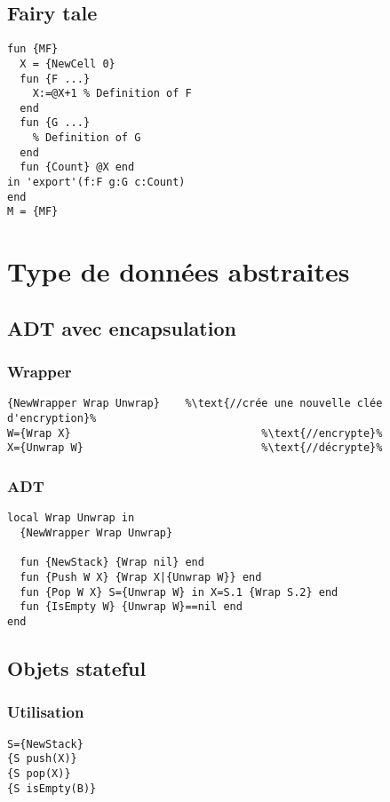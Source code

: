 \documentclass{report}
\begin{document}
\subsection{Fairy tale}
\begin{lstlisting}
fun {MF} 
  X = {NewCell 0}
  fun {F ...} 
    X:=@X+1 % Definition of F
  end 
  fun {G ...} 
    % Definition of G
  end 
  fun {Count} @X end
in 'export'(f:F g:G c:Count)
end
M = {MF}
\end{lstlisting}

\section{Type de données abstraites}
\subsection{ADT avec encapsulation}
\subsubsection*{Wrapper}
\begin{lstlisting}[escapechar=\%]
{NewWrapper Wrap Unwrap}	%\text{//crée une nouvelle clée d'encryption}%
W={Wrap X} 								%\text{//encrypte}%
X={Unwrap W} 							%\text{//décrypte}%
\end{lstlisting}
\subsubsection{ADT}
\begin{lstlisting}[escapechar=\%]
local Wrap Unwrap in
  {NewWrapper Wrap Unwrap}

  fun {NewStack} {Wrap nil} end 
  fun {Push W X} {Wrap X|{Unwrap W}} end 
  fun {Pop W X} S={Unwrap W} in X=S.1 {Wrap S.2} end
  fun {IsEmpty W} {Unwrap W}==nil end
end
\end{lstlisting}

\subsection{Objets stateful}
\subsubsection{Utilisation}
\begin{lstlisting}[escapechar=\%]
S={NewStack} 
{S push(X)} 
{S pop(X)}
{S isEmpty(B)}
\end{lstlisting}
\end{document}
